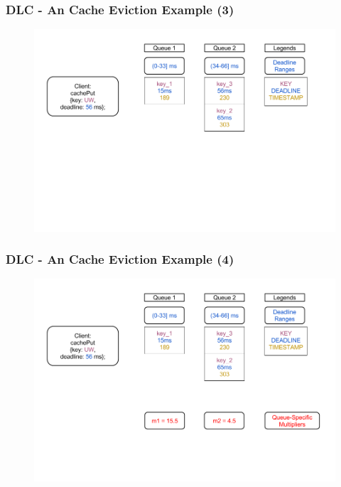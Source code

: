 \documentclass{beamer}
\begin{document}
\begin{frame}
  \frametitle{DLC - An Cache Eviction Example (3)}
  \begin{figure}
    \begin{center}
      \centerline{\includegraphics[scale=0.33]{img/DLC_V5_3.png}}
    \end{center}
  \end{figure}
\end{frame}

\begin{frame}
  \frametitle{DLC - An Cache Eviction Example (4)}
  \begin{figure}
    \begin{center}
      \centerline{\includegraphics[scale=0.33]{img/DLC_V5_4.png}}
    \end{center}
  \end{figure}
\end{frame}
\end{document}

